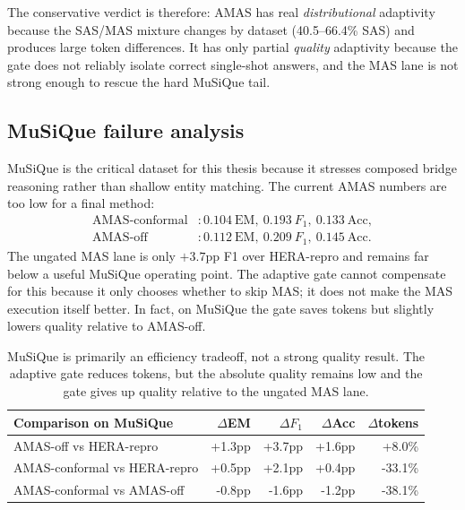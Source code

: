 \documentclass[11pt]{article}
\newcommand{\amas}{AMAS\xspace}
\newcommand{\hera}{HERA\xspace}
\newcommand{\sas}{SAS\xspace}
\newcommand{\mas}{MAS\xspace}
\begin{document}
The conservative verdict is therefore: \amas has real \emph{distributional}
adaptivity because the \sas/\mas mixture changes by dataset (40.5--66.4\%
\sas) and produces large token differences. It has only partial
\emph{quality} adaptivity because the gate does not reliably isolate correct
single-shot answers, and the \mas lane is not strong enough to rescue the
hard MuSiQue tail.

\subsection{MuSiQue failure analysis}
\label{sec:musique-failure}

MuSiQue is the critical dataset for this thesis because it stresses composed
bridge reasoning rather than shallow entity matching. The current \amas
numbers are too low for a final method:
\[
\begin{aligned}
\text{\amas-conformal} &: 0.104\ \mathrm{EM},\ 0.193\ F_1,\ 0.133\ \mathrm{Acc},\\
\text{\amas-off} &: 0.112\ \mathrm{EM},\ 0.209\ F_1,\ 0.145\ \mathrm{Acc}.
\end{aligned}
\]
The ungated \mas lane is only $+3.7$pp F1 over \hera-repro and remains far
below a useful MuSiQue operating point. The adaptive gate cannot compensate
for this because it only chooses whether to skip \mas; it does not make the
\mas execution itself better. In fact, on MuSiQue the gate saves tokens but
slightly lowers quality relative to \amas-off.

\begin{table}[H]
\centering
\small
\begin{tabular}{lrrrr}
\toprule
\textbf{Comparison on MuSiQue} & \textbf{$\Delta$EM} & \textbf{$\Delta F_1$} & \textbf{$\Delta$Acc} & \textbf{$\Delta$tokens} \\
\midrule
\amas-off vs \hera-repro        & +1.3pp & +3.7pp & +1.6pp & +8.0\% \\
\amas-conformal vs \hera-repro  & +0.5pp & +2.1pp & +0.4pp & -33.1\% \\
\amas-conformal vs \amas-off    & -0.8pp & -1.6pp & -1.2pp & -38.1\% \\
\bottomrule
\end{tabular}
\caption{MuSiQue is primarily an efficiency tradeoff, not a strong quality
result. The adaptive gate reduces tokens, but the absolute quality remains
low and the gate gives up quality relative to the ungated \mas lane.}
\label{tab:musique-delta}
\end{table}
\end{document}
